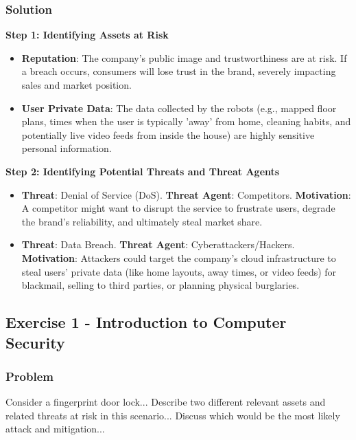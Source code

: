 \documentclass{article}
\begin{document}
\subsubsection*{Solution}
\textbf{Step 1: Identifying Assets at Risk}
\begin{itemize}
    \item[\textbf{1.}] \textbf{Reputation}: The company's public image and trustworthiness are at risk. If a breach occurs, consumers will lose trust in the brand, severely impacting sales and market position.
    \item[\textbf{2.}] \textbf{User Private Data}: The data collected by the robots (e.g., mapped floor plans, times when the user is typically 'away' from home, cleaning habits, and potentially live video feeds from inside the house) are highly sensitive personal information.

\end{itemize}
\textbf{Step 2: Identifying Potential Threats and Threat Agents}
\begin{itemize}
    \item[\textbf{1.}] \textbf{Threat}: Denial of Service (DoS). \textbf{Threat Agent}: Competitors. \textbf{Motivation}: A competitor might want to disrupt the service to frustrate users, degrade the brand's reliability, and ultimately steal market share.
    \item[\textbf{2.}] \textbf{Threat}: Data Breach. \textbf{Threat Agent}: Cyberattackers/Hackers. \textbf{Motivation}: Attackers could target the company's cloud infrastructure to steal users' private data (like home layouts, away times, or video feeds) for blackmail, selling to third parties, or planning physical burglaries.
\end{itemize}

\subsection{Exercise 1 - Introduction to Computer Security}
\subsubsection*{Problem}
Consider a fingerprint door lock... Describe two different relevant assets and related threats at risk in this scenario... Discuss which would be the most likely attack and mitigation...
\end{document}
